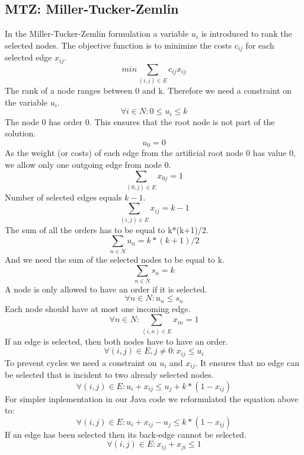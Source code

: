 \documentclass{article}
\begin{document}
\subsection{MTZ: Miller-Tucker-Zemlin \label{mtz}}
In the Miller-Tucker-Zemlin formulation a variable $u_i$ is introduced to rank the selected nodes. The objective function is to minimize the costs $c_{ij}$ for each selected edge $x_{ij}$.
\setcounter{equation}{0}
\begin{equation}
min \sum_{(i,j) \in E} c_{ij} x_{ij}
\end{equation}
The rank of a node ranges between 0 and k. Therefore we need a constraint on the variable $u_i$.
\begin{equation}
\forall i \in N : 0 \le u_i \le k
\end{equation}
The node 0 has order 0. This ensures that the root node is not part of the solution.
\begin{equation}
u_0 = 0
\end{equation}
As the weight (or costs) of each edge from the artificial root node 0 has value 0, we allow only one outgoing edge from node 0.
\begin{equation}
\sum_{(0,j) \in E} x_{0j} = 1
\end{equation}
Number of selected edges equals $k-1$.
\begin{equation}
\sum_{(i,j) \in E} x_{ij} = k - 1
\end{equation}
The sum of all the orders has to be equal to k*(k+1)/2.
\begin{equation}
\sum_{n \in N} u_n = k*(k+1)/2
\end{equation}
And we need the sum of the selected nodes to be equal to k.
\begin{equation}
\sum_{n \in N} s_n = k
\end{equation}
A node is only allowed to have an order if it is selected.
\begin{equation}
\forall n \in N: u_n \le s_n
\end{equation}
Each node should have at most one incoming edge.
\begin{equation}
\forall n \in N: \sum_{(i,n) \in E} x_{in} = 1
\end{equation}
If an edge is selected, then both nodes have to have an order.
\begin{equation}
\forall (i,j) \in E, j \not= 0: x_{ij} \le u_i
\end{equation}
To prevent cycles we need a constraint on $u_i$ and $x_{ij}$. It ensures that no edge can be selected that is incident to two already selected nodes.
\begin{equation}
\forall (i,j) \in E : u_i + x_{ij} \le u_j + k * ( 1 - x_{ij})
\end{equation}
For simpler inplementation in our Java code we reformulated the equation above to:
\setcounter{equation}{10}
\begin{equation}
\forall (i,j) \in E : u_i + x_{ij} - u_j \le k * ( 1 - x_{ij})
\end{equation}
If an edge has been selected then its back-edge cannot be selected.
\begin{equation}
\forall (i,j) \in E: x_{ij} + x_{ji} \le 1
\end{equation}
\end{document}

